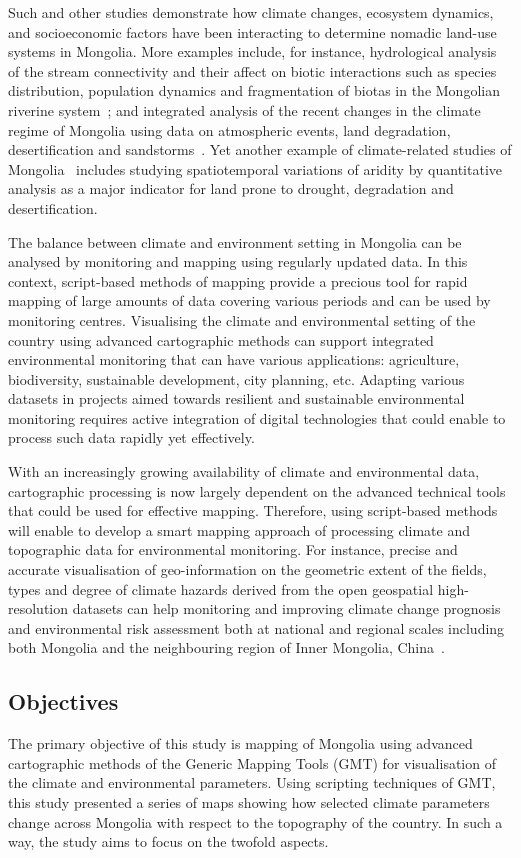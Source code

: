 \documentclass[geosciences,article,accept,pdftex,oneauthor]{Definitions/mdpi}
\begin{document}
Such and other studies demonstrate how climate changes, ecosystem dynamics, and socioeconomic factors have been interacting to determine nomadic land-use systems in Mongolia. More examples include, for instance, hydrological analysis of the stream connectivity and their affect on biotic interactions such as species distribution, population dynamics and fragmentation of biotas in the Mongolian riverine system~\cite{Maasri}; and integrated analysis of the recent changes in the climate regime of Mongolia using data on atmospheric events, land degradation, desertification and sandstorms~\cite{Hanetal}. Yet another example of climate-related studies of Mongolia~\cite{Nyamtseren} includes studying spatiotemporal variations of aridity by quantitative analysis as a major indicator for land prone to drought, degradation and desertification.

{The balance between climate and environment setting in Mongolia can be analysed by monitoring and mapping using regularly updated data. In this context, script-based methods of mapping provide a precious tool for rapid mapping of large amounts of data covering various periods and can be used by monitoring centres. Visualising the climate and environmental setting of the country using advanced cartographic methods can support integrated environmental monitoring that can have various applications: agriculture, biodiversity, sustainable development, city planning, etc. Adapting various datasets in projects aimed towards resilient and sustainable environmental monitoring requires active integration of digital technologies that could enable to process such data rapidly yet effectively.}

{With an increasingly growing availability of climate and environmental data, cartographic processing is now largely dependent on the advanced technical tools that could be used for effective mapping. Therefore, using script-based methods will enable to develop a smart mapping approach of processing climate and topographic data for environmental monitoring. For instance,} precise and accurate visualisation of geo-information on the geometric extent of the fields, types and degree of climate hazards derived from the open geospatial high-resolution datasets can help monitoring and improving climate change prognosis and environmental risk assessment both at national and regional scales including both Mongolia and the neighbouring region of Inner Mongolia, China~\cite{JIE2021353,5631071,5964785}. 

\subsection{Objectives}
The primary objective of this study is mapping of Mongolia using advanced cartographic methods of the Generic Mapping Tools (GMT) for visualisation of the climate and environmental parameters. Using scripting techniques of GMT, this study presented a series of maps showing how selected climate parameters change across Mongolia with respect to the topography of the country. In such a way, the study aims to focus on the twofold aspects.
\end{document}
